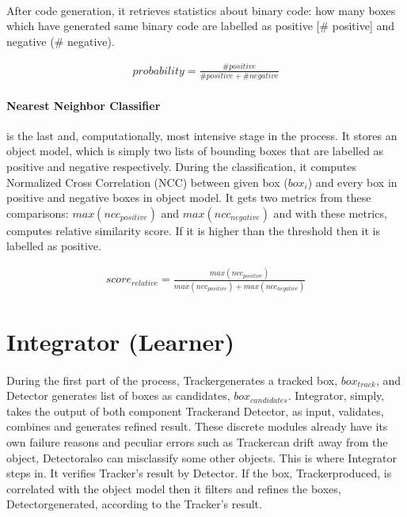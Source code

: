 \documentclass{report}
\newcommand{\Tracker}{Tracker}
\newcommand{\Detector}{Detector}
\begin{document}
        \paragraph{}
            After code generation, it retrieves statistics about binary code: how many boxes which have generated
            same binary code are labelled as positive [\# positive] and negative (\# negative).

            \begin{gather}
                probability = \frac {\# positive} {\# positive + \# negative}
            \end{gather}


        \paragraph{Nearest Neighbor Classifier} is the last and, computationally, most intensive stage in the process.
            It stores an object model, which is simply two lists of bounding boxes that are labelled
            as positive and negative respectively. During the classification,
            it computes Normalized Cross Correlation (NCC) between given box ($box_{i}$) and every box in positive and
            negative boxes in object model. It gets two metrics from these comparisons: $max(ncc_{positive})$ and $max(ncc_{negative})$ and
            with these metrics, computes relative similarity score. If it is higher than the threshold then it is labelled as positive.

            \begin{gather}
                score_{relative} = \frac {max(ncc_{positive})} {max(ncc_{positive}) + max(ncc_{negative})}
            \end{gather}
    \section{Integrator (Learner)}
        \paragraph{}
            During the first part of the process, \Tracker generates a tracked box, $ box_{track} $, and Detector generates list of
            boxes as candidates, $ box_{candidates} $. Integrator, simply, takes the output of
            both component \Tracker and \Detector, as input, validates, combines
            and generates refined result. These discrete modules already have its own failure reasons
            and peculiar errors such as \Tracker can drift away from the object, \Detector also can misclassify some other objects.
            This is where Integrator steps in. It verifies \Tracker's result by \Detector.
            If the box, \Tracker produced, is correlated with the object model then it filters and refines the boxes,
            \Detector generated, according to the \Tracker's result.
\end{document}
